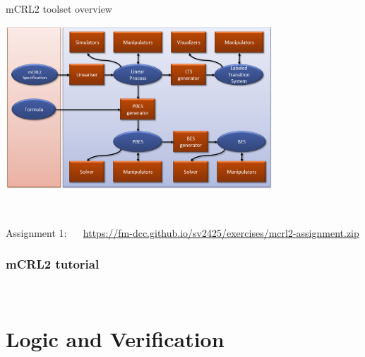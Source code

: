 \documentclass[aspectratio=169]{beamer}
\begin{document}
\begin{slide}{mCRL2 toolset overview}
  \centering
  
  \includegraphics[width=0.75\textwidth]{images/mcrl2-toolset.png}

  \\[-10mm]
  \begin{block}{}\centering
    Assignment 1: ~~ 
  \mbox{\alert{\footnotesize\url{https://fm-dcc.github.io/sv2425/exercises/mcrl2-assignment.zip}}}
  \end{block}
%
\end{slide}

\begin{frame}[t]\frametitle{mCRL2 tutorial}
  \centering\Large 
  ~\\[15mm]
  \begin{alertblock}{}
  \end{alertblock}
\end{frame}

\section{Logic and Verification}
\end{document}
